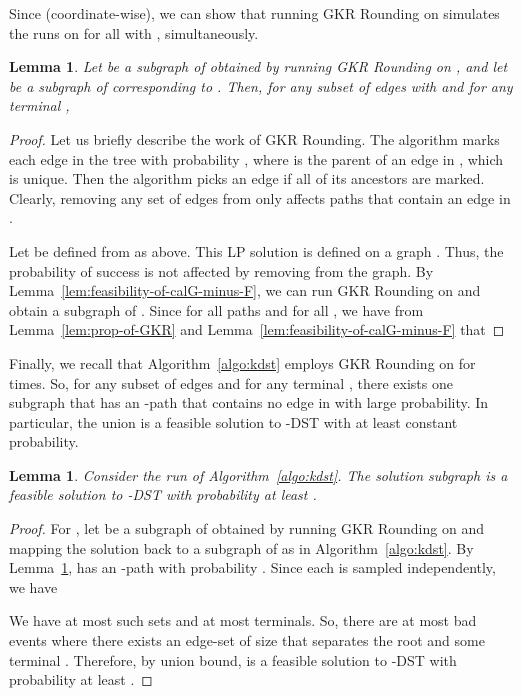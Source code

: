 \documentclass[11pt]{article}
\newtheorem{lemma}[theorem]{Lemma}
\theoremstyle{definition}
\theoremstyle{remark}
\begin{document}
Since  (coordinate-wise),
we can show that running GKR Rounding 
on  simulates 
the runs on  for all 
with , simultaneously.

\begin{lemma}
\label{lem:backward-feasible-kDST}
Let  be a subgraph of  obtained by
running GKR Rounding on ,
and let  be a subgraph of  corresponding to .
Then, for any subset of edges  with 
and for any terminal , 

\end{lemma}
\begin{proof}
Let us briefly describe the work of GKR Rounding.
The algorithm marks each edge  in the tree with
probability , where  is the parent of
an edge  in , which is unique.
Then the algorithm picks an edge  if all of its ancestors
are marked. 
Clearly, removing any set of edges  from 
only affects paths that contain an edge in .

Let  be defined from  as above.
This LP solution is defined on a graph .
Thus, the probability of success is not affected by removing 
from the graph. 
By Lemma~\ref{lem:feasibility-of-calG-minus-F},
we can run GKR Rounding on  and obtain
a subgraph  of .
Since  for all paths 
and  for all ,
we have from Lemma~\ref{lem:prop-of-GKR}
and Lemma~\ref{lem:feasibility-of-calG-minus-F} that

\end{proof}

Finally, we recall that Algorithm~\ref{algo:kdst} employs
GKR Rounding on  for  times.
So, for any subset of  edges 
and for any terminal ,
there exists one subgraph that has an -path 
that contains no edge in  with large probability.
In particular, the union is a feasible solution to -DST
with at least constant probability.
\begin{lemma}
Consider the run of Algorithm~\ref{algo:kdst}.
The solution subgraph  
is a feasible solution to -DST
with probability at least .
\end{lemma}
\begin{proof}
For , let  be a subgraph of  
obtained by running GKR Rounding on 
and mapping the solution back to a subgraph of 
as in Algorithm~\ref{algo:kdst}.
By Lemma~\ref{lem:backward-feasible-kDST},  
has an -path with probability .
Since each  is sampled independently, we have

We have at most  such sets  and
at most  terminals.
So, there are at most  bad events where 
there exists an edge-set of size  that 
separates the root  and some terminal .
Therefore, by union bound,  is a feasible solution 
to -DST with probability at least .
\end{proof}
\end{document}
